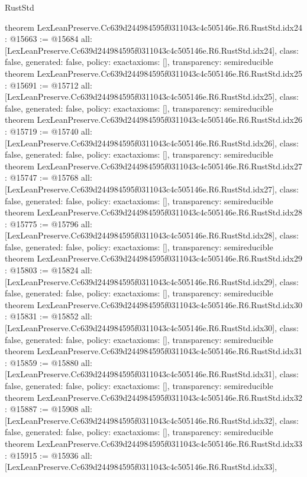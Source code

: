 \begin{lexlean}{RustStd}
\begin{coremodule}
{}
theorem LexLeanPreserve.Cc639d244984595f0311043c4c505146e.R6.RustStd.idx24 : @15663 := @15684 {
  all: [LexLeanPreserve.Cc639d244984595f0311043c4c505146e.R6.RustStd.idx24],
  class: false,
  generated: false,
  policy: exact{axioms: []},
  transparency: semireducible
}
theorem LexLeanPreserve.Cc639d244984595f0311043c4c505146e.R6.RustStd.idx25 : @15691 := @15712 {
  all: [LexLeanPreserve.Cc639d244984595f0311043c4c505146e.R6.RustStd.idx25],
  class: false,
  generated: false,
  policy: exact{axioms: []},
  transparency: semireducible
}
theorem LexLeanPreserve.Cc639d244984595f0311043c4c505146e.R6.RustStd.idx26 : @15719 := @15740 {
  all: [LexLeanPreserve.Cc639d244984595f0311043c4c505146e.R6.RustStd.idx26],
  class: false,
  generated: false,
  policy: exact{axioms: []},
  transparency: semireducible
}
theorem LexLeanPreserve.Cc639d244984595f0311043c4c505146e.R6.RustStd.idx27 : @15747 := @15768 {
  all: [LexLeanPreserve.Cc639d244984595f0311043c4c505146e.R6.RustStd.idx27],
  class: false,
  generated: false,
  policy: exact{axioms: []},
  transparency: semireducible
}
theorem LexLeanPreserve.Cc639d244984595f0311043c4c505146e.R6.RustStd.idx28 : @15775 := @15796 {
  all: [LexLeanPreserve.Cc639d244984595f0311043c4c505146e.R6.RustStd.idx28],
  class: false,
  generated: false,
  policy: exact{axioms: []},
  transparency: semireducible
}
theorem LexLeanPreserve.Cc639d244984595f0311043c4c505146e.R6.RustStd.idx29 : @15803 := @15824 {
  all: [LexLeanPreserve.Cc639d244984595f0311043c4c505146e.R6.RustStd.idx29],
  class: false,
  generated: false,
  policy: exact{axioms: []},
  transparency: semireducible
}
theorem LexLeanPreserve.Cc639d244984595f0311043c4c505146e.R6.RustStd.idx30 : @15831 := @15852 {
  all: [LexLeanPreserve.Cc639d244984595f0311043c4c505146e.R6.RustStd.idx30],
  class: false,
  generated: false,
  policy: exact{axioms: []},
  transparency: semireducible
}
theorem LexLeanPreserve.Cc639d244984595f0311043c4c505146e.R6.RustStd.idx31 : @15859 := @15880 {
  all: [LexLeanPreserve.Cc639d244984595f0311043c4c505146e.R6.RustStd.idx31],
  class: false,
  generated: false,
  policy: exact{axioms: []},
  transparency: semireducible
}
theorem LexLeanPreserve.Cc639d244984595f0311043c4c505146e.R6.RustStd.idx32 : @15887 := @15908 {
  all: [LexLeanPreserve.Cc639d244984595f0311043c4c505146e.R6.RustStd.idx32],
  class: false,
  generated: false,
  policy: exact{axioms: []},
  transparency: semireducible
}
theorem LexLeanPreserve.Cc639d244984595f0311043c4c505146e.R6.RustStd.idx33 : @15915 := @15936 {
  all: [LexLeanPreserve.Cc639d244984595f0311043c4c505146e.R6.RustStd.idx33],
}
\end{coremodule}
\end{lexlean}
